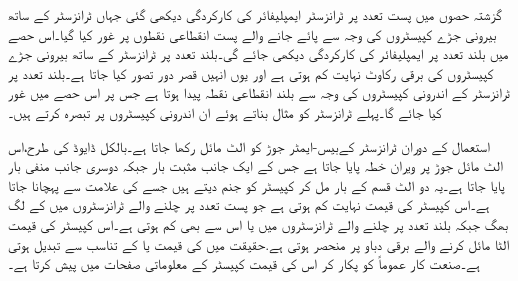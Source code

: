 گزشتہ حصوں میں پست تعدد پر ٹرانزسٹر ایمپلیفائر کی کارکردگی دیکھی گئی جہاں ٹرانزسٹر کے ساتھ بیرونی جڑے کپیسٹروں کی وجہ سے پائے جانے والے پست انقطاعی نقطوں پر غور کیا گیا۔اس حصے میں بلند تعدد پر ایمپلیفائر کی کارکردگی دیکھی جائے گی۔بلند تعدد پر ٹرانزسٹر کے ساتھ بیرونی جڑے کپیسٹروں کی برقی رکاوٹ   نہایت کم ہوتی ہے اور یوں انہیں قصر دور تصور کیا جاتا ہے۔بلند تعدد پر ٹرانزسٹر کے اندرونی کپیسٹروں کی وجہ سے بلند انقطاعی نقطہ  پیدا ہوتا ہے جس پر اس حصے میں غور کیا جائے گا۔پہلے  ٹرانزسٹر کو مثال بناتے ہوئے ان اندرونی کپیسٹروں پر تبصرہ کرتے ہیں۔

استعمال کے دوران ٹرانزسٹر کےبیس-ایمٹر    جوڑ  کو الٹ مائل رکھا جاتا ہے۔بالکل ڈایوڈ کی طرح،اس  الٹ مائل  جوڑ پر ویران خطہ پایا جاتا ہے جس کے ایک جانب مثبت بار جبکہ دوسری جانب منفی بار پایا جاتا ہے۔یہ دو الٹ قسم کے بار مل کر کپیسٹر کو جنم دیتے ہیں جسے  کی علامت سے پہچانا جاتا ہے۔اس کپیسٹر کی قیمت نہایت کم ہوتی ہے جو پست تعدد پر چلنے والے ٹرانزسٹروں میں  کے لگ بھگ  جبکہ بلند تعدد پر چلنے والے ٹرانزسٹروں میں  یا اس سے بھی کم ہوتی ہے۔اس کپیسٹر کی قیمت الٹا مائل کرنے والے برقی دباو  پر منحصر ہوتی ہے.حقیقت میں  کی قیمت  یا   کے تناسب  سے تبدیل ہوتی ہے۔صنعت کار عموماً  کو  پکار کر اس کی قیمت کپیسٹر کے معلوماتی صفحات میں پیش کرتا ہے۔

